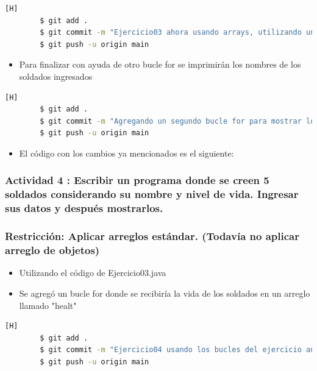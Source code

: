 \documentclass{article}
\begin{document}
    

     \begin{lstlisting}[language=bash,caption={Commit: Ejercicio03 ahora usando arrays, utilizando un bucle for para recibir los nombres}][H]
		$ git add .
		$ git commit -m "Ejercicio03 ahora usando arrays, utilizando un bucle for para recibir los nombres"			
		$ git push -u origin main
	\end{lstlisting}
 
     \begin{itemize}
        \item  Para finalizar con ayuda de otro bucle for se imprimirán los nombres de los soldados ingresados
    \end{itemize} 
    
	
    \begin{lstlisting}[language=bash,caption={Commit: Agregando un segundo bucle for para mostrar los datos (nombres)}][H]
		$ git add .
		$ git commit -m "Agregando un segundo bucle for para mostrar los datos (nombres)"			
		$ git push -u origin main
	\end{lstlisting}
 
    \begin{itemize}
        \item El código con los cambios ya mencionados es el siguiente: 
    \end{itemize} 
	


    \subsubsection{Actividad 4 : Escribir un programa donde se creen 5 soldados considerando su nombre y nivel de vida. Ingresar sus datos y después mostrarlos. \\\\
    \color{red}Restricción: Aplicar arreglos estándar. (Todavía no aplicar arreglo de objetos)}

    \begin{itemize}
        \item Utilizando el código de Ejercicio03.java 
        \item Se agregó un bucle for donde se recibiría la vida de los soldados en un arreglo llamado "healt"
    \end{itemize}
	
    \begin{lstlisting}[language=bash,caption={Commit: Ejercicio04 usando los bucles del ejercicio anterior para los nombres y creando un bucle para recibir las vidas}][H]
		$ git add .
		$ git commit -m "Ejercicio04 usando los bucles del ejercicio anterior para los nombres y creando un bucle para recibir las vidas"	
		$ git push -u origin main
	\end{lstlisting}
\end{document}
